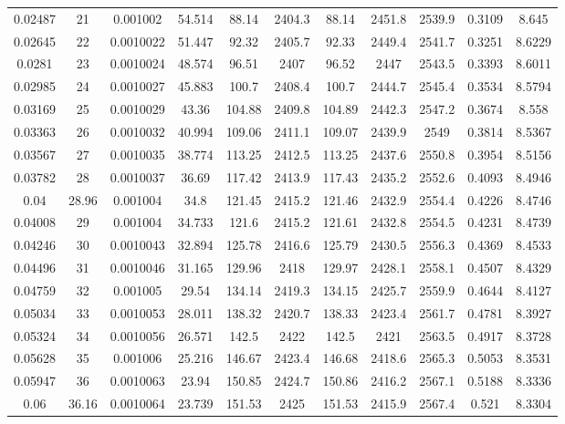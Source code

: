 \begin{longtable}{ccccccccccc}
	0.02487 & 21    & 0.001002  & 54.514   & 88.14  & 2404.3 & 88.14  & 2451.8 & 2539.9 & 0.3109 & 8.645       \\
	0.02645 & 22    & 0.0010022 & 51.447   & 92.32  & 2405.7 & 92.33  & 2449.4 & 2541.7 & 0.3251 & 8.6229      \\
	0.0281  & 23    & 0.0010024 & 48.574   & 96.51  & 2407   & 96.52  & 2447   & 2543.5 & 0.3393 & 8.6011      \\
	0.02985 & 24    & 0.0010027 & 45.883   & 100.7  & 2408.4 & 100.7  & 2444.7 & 2545.4 & 0.3534 & 8.5794      \\
	0.03169 & 25    & 0.0010029 & 43.36    & 104.88 & 2409.8 & 104.89 & 2442.3 & 2547.2 & 0.3674 & 8.558       \\
	0.03363 & 26    & 0.0010032 & 40.994   & 109.06 & 2411.1 & 109.07 & 2439.9 & 2549   & 0.3814 & 8.5367      \\
	0.03567 & 27    & 0.0010035 & 38.774   & 113.25 & 2412.5 & 113.25 & 2437.6 & 2550.8 & 0.3954 & 8.5156      \\
	0.03782 & 28    & 0.0010037 & 36.69    & 117.42 & 2413.9 & 117.43 & 2435.2 & 2552.6 & 0.4093 & 8.4946      \\
	0.04    & 28.96 & 0.001004  & 34.8     & 121.45 & 2415.2 & 121.46 & 2432.9 & 2554.4 & 0.4226 & 8.4746      \\
	0.04008 & 29    & 0.001004  & 34.733   & 121.6  & 2415.2 & 121.61 & 2432.8 & 2554.5 & 0.4231 & 8.4739      \\
	0.04246 & 30    & 0.0010043 & 32.894   & 125.78 & 2416.6 & 125.79 & 2430.5 & 2556.3 & 0.4369 & 8.4533      \\
	0.04496 & 31    & 0.0010046 & 31.165   & 129.96 & 2418   & 129.97 & 2428.1 & 2558.1 & 0.4507 & 8.4329      \\
	0.04759 & 32    & 0.001005  & 29.54    & 134.14 & 2419.3 & 134.15 & 2425.7 & 2559.9 & 0.4644 & 8.4127      \\
	0.05034 & 33    & 0.0010053 & 28.011   & 138.32 & 2420.7 & 138.33 & 2423.4 & 2561.7 & 0.4781 & 8.3927      \\
	0.05324 & 34    & 0.0010056 & 26.571   & 142.5  & 2422   & 142.5  & 2421   & 2563.5 & 0.4917 & 8.3728      \\
	0.05628 & 35    & 0.001006  & 25.216   & 146.67 & 2423.4 & 146.68 & 2418.6 & 2565.3 & 0.5053 & 8.3531      \\
	0.05947 & 36    & 0.0010063 & 23.94    & 150.85 & 2424.7 & 150.86 & 2416.2 & 2567.1 & 0.5188 & 8.3336      \\
	0.06    & 36.16 & 0.0010064 & 23.739   & 151.53 & 2425   & 151.53 & 2415.9 & 2567.4 & 0.521  & 8.3304      \\

\end{longtable}
